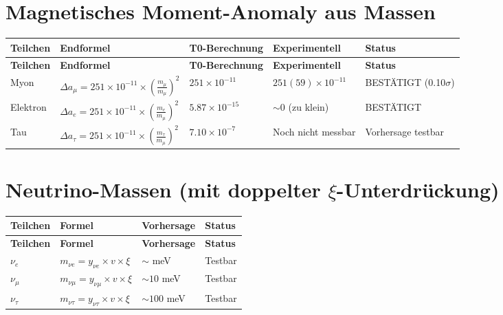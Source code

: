 \documentclass[12pt,a4paper]{article}
\begin{document}
	\section{Magnetisches Moment-Anomaly aus Massen}
	
	\begin{longtable}{|p{2.5cm}|p{4.5cm}|p{3cm}|p{3cm}|p{2cm}|}
		\hline
		\textbf{Teilchen} & \textbf{Endformel} & \textbf{T0-Berechnung} & \textbf{Experimentell} & \textbf{Status} \\
		\hline
		\endfirsthead
		\hline
		\textbf{Teilchen} & \textbf{Endformel} & \textbf{T0-Berechnung} & \textbf{Experimentell} & \textbf{Status} \\
		\hline
		\endhead
		Myon & \(\Delta a_{\mu} = 251 \times 10^{-11} \times \left(\frac{m_{\mu}}{m_{\mu}}\right)^{2}\) & \(251 \times 10^{-11}\) & \(251(59) \times 10^{-11}\) & BESTÄTIGT (0.10\(\sigma\)) \\
		\hline
		Elektron & \(\Delta a_{e} = 251 \times 10^{-11} \times \left(\frac{m_{e}}{m_{\mu}}\right)^{2}\) & \(5.87 \times 10^{-15}\) & \(\sim 0\) (zu klein) & BESTÄTIGT \\
		\hline
		Tau & \(\Delta a_{\tau} = 251 \times 10^{-11} \times \left(\frac{m_{\tau}}{m_{\mu}}\right)^{2}\) & \(7.10 \times 10^{-7}\) & Noch nicht messbar & Vorhersage testbar \\
		\hline
	\end{longtable}
	
	\section{Neutrino-Massen (mit doppelter \(\xi\)-Unterdrückung)}
	
	\begin{longtable}{|p{3cm}|p{4cm}|p{3cm}|p{3cm}|}
		\hline
		\textbf{Teilchen} & \textbf{Formel} & \textbf{Vorhersage} & \textbf{Status} \\
		\hline
		\endfirsthead
		\hline
		\textbf{Teilchen} & \textbf{Formel} & \textbf{Vorhersage} & \textbf{Status} \\
		\hline
		\endhead
		\(\nu_e\) & \(m_{\nu e} = y_{\nu e} \times v \times \xi\) & \(\sim\) meV & Testbar \\
		\hline
		\(\nu_{\mu}\) & \(m_{\nu \mu} = y_{\nu \mu} \times v \times \xi\) & \(\sim 10\) meV & Testbar \\
		\hline
		\(\nu_{\tau}\) & \(m_{\nu \tau} = y_{\nu \tau} \times v \times \xi\) & \(\sim 100\) meV & Testbar \\
		\hline
	\end{longtable}
	
\end{document}
